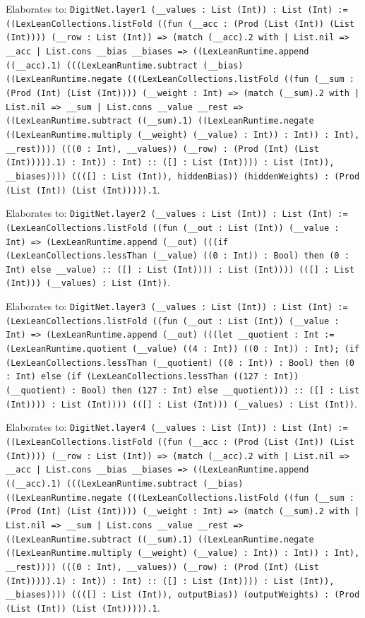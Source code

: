 \documentclass[11pt]{article}
\begin{document}
\noindent Elaborates to: \texttt{DigitNet.layer1 (\_\_values : List (Int)) : List (Int) := ((LexLeanCollections.listFold ((fun (\_\_acc : (Prod (List (Int)) (List (Int)))) (\_\_row : List (Int)) => (match (\_\_acc).2 with | List.nil => \_\_acc | List.cons \_\_bias \_\_biases => ((LexLeanRuntime.append ((\_\_acc).1) (((LexLeanRuntime.subtract (\_\_bias) ((LexLeanRuntime.negate (((LexLeanCollections.listFold ((fun (\_\_sum : (Prod (Int) (List (Int)))) (\_\_weight : Int) => (match (\_\_sum).2 with | List.nil => \_\_sum | List.cons \_\_value \_\_rest => ((LexLeanRuntime.subtract ((\_\_sum).1) ((LexLeanRuntime.negate ((LexLeanRuntime.multiply (\_\_weight) (\_\_value) : Int)) : Int)) : Int), \_\_rest)))) (((0 : Int), \_\_values)) (\_\_row) : (Prod (Int) (List (Int))))).1) : Int)) : Int) :: ([] : List (Int)))) : List (Int)), \_\_biases)))) ((([] : List (Int)), hiddenBias)) (hiddenWeights) : (Prod (List (Int)) (List (Int))))).1}.\par
\noindent Elaborates to: \texttt{DigitNet.layer2 (\_\_values : List (Int)) : List (Int) := (LexLeanCollections.listFold ((fun (\_\_out : List (Int)) (\_\_value : Int) => (LexLeanRuntime.append (\_\_out) (((if (LexLeanCollections.lessThan (\_\_value) ((0 : Int)) : Bool) then (0 : Int) else \_\_value) :: ([] : List (Int)))) : List (Int)))) (([] : List (Int))) (\_\_values) : List (Int))}.\par
\noindent Elaborates to: \texttt{DigitNet.layer3 (\_\_values : List (Int)) : List (Int) := (LexLeanCollections.listFold ((fun (\_\_out : List (Int)) (\_\_value : Int) => (LexLeanRuntime.append (\_\_out) (((let \_\_quotient : Int := (LexLeanRuntime.quotient (\_\_value) ((4 : Int)) ((0 : Int)) : Int); (if (LexLeanCollections.lessThan (\_\_quotient) ((0 : Int)) : Bool) then (0 : Int) else (if (LexLeanCollections.lessThan ((127 : Int)) (\_\_quotient) : Bool) then (127 : Int) else \_\_quotient))) :: ([] : List (Int)))) : List (Int)))) (([] : List (Int))) (\_\_values) : List (Int))}.\par
\noindent Elaborates to: \texttt{DigitNet.layer4 (\_\_values : List (Int)) : List (Int) := ((LexLeanCollections.listFold ((fun (\_\_acc : (Prod (List (Int)) (List (Int)))) (\_\_row : List (Int)) => (match (\_\_acc).2 with | List.nil => \_\_acc | List.cons \_\_bias \_\_biases => ((LexLeanRuntime.append ((\_\_acc).1) (((LexLeanRuntime.subtract (\_\_bias) ((LexLeanRuntime.negate (((LexLeanCollections.listFold ((fun (\_\_sum : (Prod (Int) (List (Int)))) (\_\_weight : Int) => (match (\_\_sum).2 with | List.nil => \_\_sum | List.cons \_\_value \_\_rest => ((LexLeanRuntime.subtract ((\_\_sum).1) ((LexLeanRuntime.negate ((LexLeanRuntime.multiply (\_\_weight) (\_\_value) : Int)) : Int)) : Int), \_\_rest)))) (((0 : Int), \_\_values)) (\_\_row) : (Prod (Int) (List (Int))))).1) : Int)) : Int) :: ([] : List (Int)))) : List (Int)), \_\_biases)))) ((([] : List (Int)), outputBias)) (outputWeights) : (Prod (List (Int)) (List (Int))))).1}.\par
\end{document}
